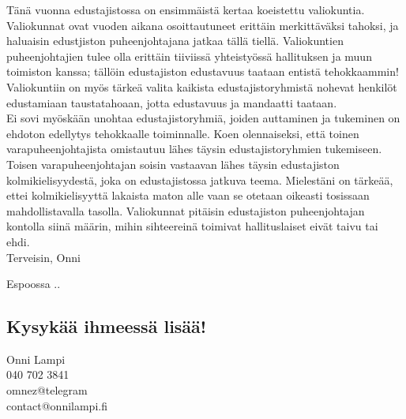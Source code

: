 \documentclass[a4paper, 12pt, finnish]{report}
\newcommand*{\findate}{\the\day.\the\month.\the\year}
\begin{document}
Tänä vuonna edustajistossa on ensimmäistä kertaa koeistettu valiokuntia.
Valiokunnat ovat vuoden aikana osoittautuneet erittäin merkittäväksi tahoksi, ja haluaisin edustjiston puheenjohtajana jatkaa tällä tiellä.
Valiokuntien puheenjohtajien tulee olla erittäin tiiviissä yhteistyössä hallituksen ja muun toimiston kanssa; tällöin edustajiston edustavuus taataan entistä tehokkaammin!
Valiokuntiin on myös tärkeä valita kaikista edustajistoryhmistä nohevat henkilöt edustamiaan taustatahoaan, jotta edustavuus ja mandaatti taataan.\\

Ei sovi myöskään unohtaa edustajistoryhmiä, joiden auttaminen ja tukeminen on ehdoton edellytys tehokkaalle toiminnalle.
Koen olennaiseksi, että toinen varapuheenjohtajista omistautuu lähes täysin edustajistoryhmien tukemiseen.
Toisen varapuheenjohtajan soisin vastaavan lähes täysin edustajiston kolmikielisyydestä, joka on edustajistossa jatkuva teema.
Mielestäni on tärkeää, ettei kolmikielisyyttä lakaista maton alle vaan se otetaan oikeasti tosissaan mahdollistavalla tasolla.
Valiokunnat pitäisin edustajiston puheenjohtajan kontolla siinä määrin, mihin sihteereinä toimivat hallituslaiset eivät taivu tai ehdi.\\


Terveisin, Onni

Espoossa \findate

\subsection*{Kysykää ihmeessä lisää!}
Onni Lampi\\
040 702 3841\\
omnez@telegram\\
contact@onnilampi.fi
\end{document}
